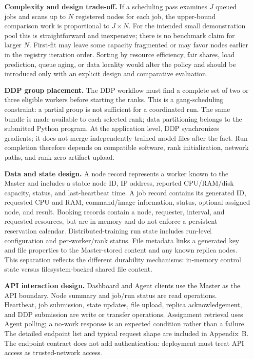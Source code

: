 \documentclass{article}
\begin{document}
\textbf{Complexity and design trade-off.} If a scheduling pass examines \(J\) queued jobs and scans up to \(N\) registered nodes for each job, the upper-bound comparison work is proportional to \(J\times N\). For the intended small demonstration pool this is straightforward and inexpensive; there is no benchmark claim for larger \(N\). First-fit may leave some capacity fragmented or may favor nodes earlier in the registry iteration order. Sorting by resource efficiency, fair shares, load prediction, queue aging, or data locality would alter the policy and should be introduced only with an explicit design and comparative evaluation.

\textbf{DDP group placement.} The DDP workflow must find a complete set of two or three eligible workers before starting the ranks. This is a gang-scheduling constraint: a partial group is not sufficient for a coordinated run. The same bundle is made available to each selected rank; data partitioning belongs to the submitted Python program. At the application level, DDP synchronizes gradients; it does not merge independently trained model files after the fact. Run completion therefore depends on compatible software, rank initialization, network paths, and rank-zero artifact upload.

\textbf{Data and state design.} A node record represents a worker known to the Master and includes a stable node ID, IP address, reported CPU/RAM/disk capacity, status, and last-heartbeat time. A job record contains its generated ID, requested CPU and RAM, command/image information, status, optional assigned node, and result. Booking records contain a node, requester, interval, and requested resources, but are in-memory and do not enforce a persistent reservation calendar. Distributed-training run state includes run-level configuration and per-worker/rank status. File metadata links a generated key and file properties to the Master-stored content and any known replica nodes. This separation reflects the different durability mechanisms: in-memory control state versus filesystem-backed shared file content.

\textbf{API interaction design.} Dashboard and Agent clients use the Master as the API boundary. Node summary and job/run status are read operations. Heartbeat, job submission, state updates, file upload, replica acknowledgement, and DDP submission are write or transfer operations. Assignment retrieval uses Agent polling; a no-work response is an expected condition rather than a failure. The detailed endpoint list and typical request shape are included in Appendix~B. The endpoint contract does not add authentication: deployment must treat API access as trusted-network access.
\end{document}
